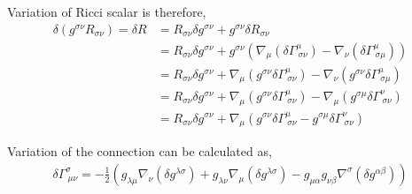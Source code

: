 Variation of Ricci scalar is therefore,
\begin{equation}
\label{eq:var_of_ricci_s}
\begin{split}
\delta\left(g^{\sigma\nu}R_{\sigma\nu}\right) = \delta R &= R_{\sigma\nu}\delta g^{\sigma\nu} + g^{\sigma\nu}\delta R_{\sigma\nu}\\
&= R_{\sigma\nu}\delta g^{\sigma\nu} + g^{\sigma\nu}\left( \nabla_{\mu}\left(\delta\Gamma^{\mu}_{\ \sigma\nu}\right) - \nabla_{\nu}\left(\delta\Gamma^{\mu}_{\ \sigma\mu}\right)\right)\\
&= R_{\sigma\nu}\delta g^{\sigma\nu} + \nabla_{\mu}\left(g^{\sigma\nu}\delta\Gamma^{\mu}_{\ \sigma\nu}\right) - \nabla_{\nu}\left(g^{\sigma\nu}\delta\Gamma^{\mu}_{\ \sigma\mu}\right)\\
&= R_{\sigma\nu}\delta g^{\sigma\nu} + \nabla_{\mu}\left(g^{\sigma\nu}\delta\Gamma^{\mu}_{\ \sigma\nu}\right) - \nabla_{\mu}\left(g^{\sigma\mu}\delta\Gamma^{\nu}_{\ \sigma\nu}\right)\\
&= R_{\sigma\nu}\delta g^{\sigma\nu} + \nabla_{\mu}\left(g^{\sigma\nu}\delta\Gamma^{\mu}_{\ \sigma\nu} - g^{\sigma\mu}\delta\Gamma^{\nu}_{\ \sigma\nu}\right)
\end{split}
\end{equation}

Variation of the connection can be calculated as,
\begin{align}
    \delta \Gamma^{\sigma}_{\ \mu\nu} = -\frac{1}{2}\left(g_{\lambda\mu}\nabla_{\nu}\left(\delta g^{\lambda\sigma}\right) + g_{\lambda\nu}\nabla_{\mu}\left(\delta g^{\lambda\sigma}\right) - g_{\mu\alpha}g_{\nu\beta}\nabla^{\sigma}\left(\delta g^{\alpha\beta}\right)\right)
\end{align}

